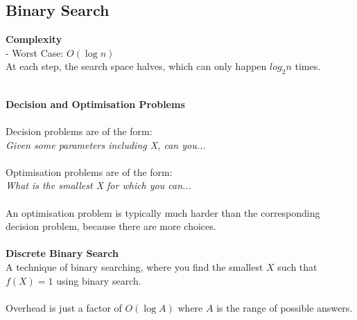 \documentclass{article}
\begin{document}
\subsection{Binary Search}
\begin{tcolorbox}
    \begin{algorithmic}
            \ELSE
            \ENDIF
        \ENDIF
    \end{algorithmic}

\end{tcolorbox}
\begin{tcolorbox}
    \textbf{Complexity} \\
    - Worst Case: $O(\log n)$ \\
    At each step, the search space halves, which can only happen $log_{2}n$ times.
\end{tcolorbox}
~\\
\textbf{Decision and Optimisation Problems} 
\\\\
Decision problems are of the form: \\
\emph{Given some parameters including X, can you...}
\\\\
Optimisation problems are of the form: \\
\emph{What is the smallest X for which you can...}
\\\\
An optimisation problem is typically much harder than the corresponding decision problem, because there are more choices.
\\\\
\textbf{Discrete Binary Search} \\
A technique of binary searching, where you find the smallest $X$ such that $f(X) = 1$ using binary search.
\\\\
Overhead is just a factor of $O(\log A)$ where $A$ is the range of possible answers.
\end{document}
